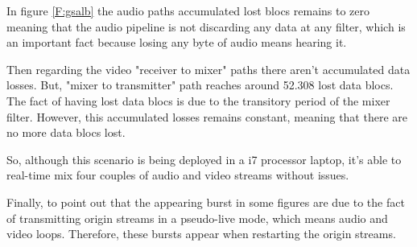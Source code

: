 In figure \ref{F:gsalb} the audio paths accumulated lost blocs remains to zero meaning that the audio pipeline is not discarding any data at any filter, which is an important fact because losing any byte of audio means hearing it. 

Then regarding the video "receiver to mixer" paths there aren't accumulated data losses. But, "mixer to transmitter" path reaches around 52.308 lost data blocs. The fact of having lost data blocs is due to the transitory period of the mixer filter. However, this accumulated losses remains constant, meaning that there are no more data blocs lost.

So, although this scenario is being deployed in a i7 processor laptop, it's able to real-time mix four couples of audio and video streams without issues.

Finally, to point out that the appearing burst in some figures are due to the fact of transmitting origin streams in a pseudo-live mode, which means audio and video loops. Therefore, these bursts appear when restarting the origin streams.